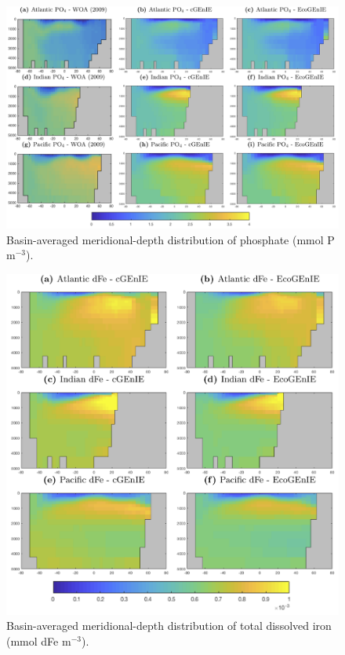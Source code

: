 \documentclass[gmd, manuscript]{copernicus}
\begin{document}
{\begin{figure}[htp]
\includegraphics[width=0.95\linewidth]{Final_figures/Fig_7.png}
\caption{Basin-averaged meridional-depth distribution of phosphate (mmol P m$^{-3}$).}
\label{fig:basin_PO4}
\end{figure}



\begin{figure}[htp]
\includegraphics[width=0.63\linewidth]{Final_figures/Fig_8.png}
\caption{Basin-averaged meridional-depth distribution of total dissolved iron (mmol dFe m$^{-3}$).}
\label{fig:basin_Fe}
\end{figure}



}
\end{document}
